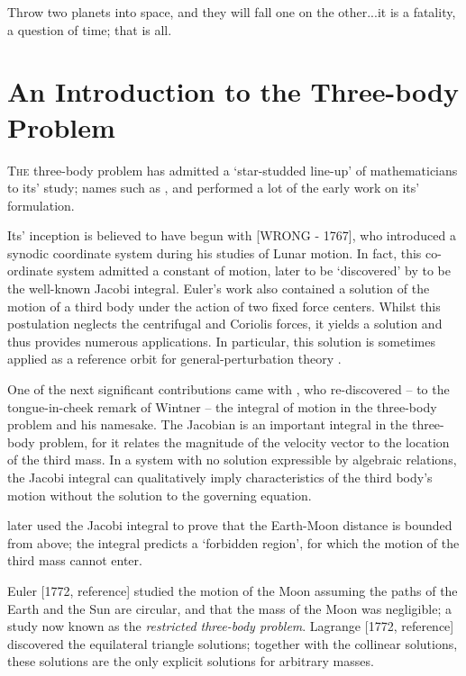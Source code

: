 \begin{savequote}[75mm]
Throw two planets into space, and they will fall one on the other...it is a fatality, a question of time; that is all.
\end{savequote}

\chapter{An Introduction to the Three-body Problem} \label{s:threebodyproblem}
\lettrine{T}{he} three-body problem has admitted a `star-studded line-up' of mathematicians to its' study; names such as \citep{Euler1736}, \citep{Jacobi1829} and \citep{Poincare1899} performed a lot of the early work on its' formulation.

Its' inception is believed to have begun with \citep{Euler1736} [WRONG - 1767], who introduced a synodic coordinate system during his studies of Lunar motion. In fact, this co-ordinate system admitted a constant of motion, later to be `discovered' by \citep{Jacobi1829} to be the well-known Jacobi integral. Euler's work also contained a solution of the motion of a third body under the action of two fixed force centers. Whilst this postulation neglects the centrifugal and Coriolis forces, it yields a solution and thus provides numerous applications. In particular, this solution is sometimes applied as a reference orbit for general-perturbation theory \citep{theoryoforbits}.

One of the next significant contributions came with \citep{Jacobi1829}, who re-discovered -- to the tongue-in-cheek remark of Wintner -- the integral of motion in the three-body problem and his namesake. The Jacobian is an important integral in the three-body problem, for it relates the magnitude of the velocity vector to the location of the third mass. In a system with no solution expressible by algebraic relations, the Jacobi integral can qualitatively imply characteristics of the third body's motion without the solution to the governing equation.

\citep{Hill1906} later used the Jacobi integral to prove that the Earth-Moon distance is bounded from above; the integral predicts a `forbidden region', for which the motion of the third mass cannot enter.

Euler [1772, reference] studied the motion of the Moon assuming the paths of the Earth and the Sun are circular, and that the mass of the Moon was negligible; a study now known as the \textit{restricted three-body problem}. Lagrange [1772, reference] discovered the equilateral triangle solutions; together with the collinear solutions, these solutions are the only explicit solutions for arbitrary masses. 

